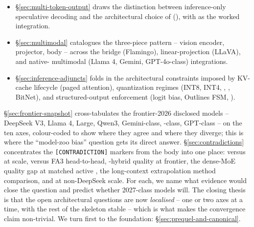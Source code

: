 \begin{itemize}
    scaffold entirely: /S5 $\to$  $\to$ -2 along the 
    lineage, and the -attention hybrid family (Jamba, Samba,
    Zamba2, Hymba) that the 2024-2026 long-context literature has
    shifted toward.
  \item \S\ref{sec:multi-token-output} draws the distinction between
    inference-only speculative decoding \citep[Leviathan et al. 2023;
    EAGLE; Medusa]{deepseek-v3} and the architectural choice of
     (), with  as the worked
    integration.
  \item \S\ref{sec:multimodal} catalogues the three-piece pattern --
    vision encoder, projector,  body -- across the 
    bridge (Flamingo), linear-projection (LLaVA), and native-
    multimodal (Llama 4, Gemini, GPT-4o-class) integrations.
  \item \S\ref{sec:inference-adjuncts} folds in the architectural
    constraints imposed by KV-cache lifecycle (paged attention),
    quantization regimes (INT8, INT4, , , BitNet), and
    structured-output enforcement (logit bias, Outlines FSM,
    ).
\end{itemize}

\S\ref{sec:frontier-snapshot} cross-tabulates the frontier-2026
disclosed models -- DeepSeek V3, Llama 4,  Large, Qwen3,
Gemini-class, -class, GPT-class -- on the ten axes, colour-coded
to show where they agree and where they diverge; this is where the
``model-zoo bias'' question gets its direct answer.
\S\ref{sec:contradictions} concentrates the
\texttt{[CONTRADICTION]} markers from the body into one place: 
versus  at scale,  versus FA3 head-to-head, -hybrid quality
at frontier, the dense-MoE quality gap at matched active ,
the long-context extrapolation method comparison, and  at
non-DeepSeek scale. For each, we name what evidence would close the
question and predict whether 2027-class models will. The closing
thesis is that the open architectural questions are now \emph{localised}
-- one or two axes at a time, with the rest of the skeleton stable --
which is what makes the convergence claim non-trivial. We turn first
to the foundation: \S\ref{sec:prequel-and-canonical}.
